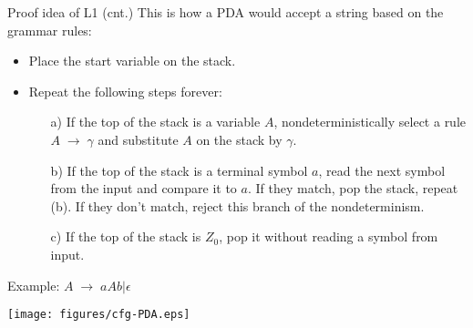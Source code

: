 \documentclass{prosper}%
\newcommand{\ra}{\mbox{$\;\rightarrow\;$}}
\begin{document}
\begin{comment}
\item The PDA's nondeterminism will come in handy, as it allows it to guess the sequence of correct substitutions.
\item $P$'s design sketch: $P$ will push on the stack left-sentential forms of $G$; and it will go through these sentential forms, making one substitution after another. Eventually it {\blue may} arrive at a configuration (a string) that contains only terminals. Then $P$ accepts if this string matches $w$.
\end{itemize}
\end{slide}
\end{comment}

\begin{slide}{Proof idea of L1 (cnt.)}
This is how a PDA would accept a string based on the grammar rules:
\begin{itemize}
\item Place the start variable on the stack.
\item Repeat the following steps forever:
\begin{enumerate}
\item[a)] If the top of the stack is a variable $A$, nondeterministically select a rule $A \ra \gamma$ and substitute $A$ on the stack by $\gamma$.
\item[b)] If the top of the stack is a terminal symbol $a$, read the next symbol from the input and compare it to $a$. If they match, pop the stack, repeat (b). If they don't match, reject this branch of the nondeterminism.
\item[c)] If the top of the stack is $Z_0$, pop it without reading a symbol from input.
\end{enumerate}
\end{itemize}
\end{slide}

\begin{slide}{Example: $A\ra aAb | \epsilon$}
\begin{center}
\texttt{[image: figures/cfg-PDA.eps]}
\end{center}
\end{slide}
\end{document}
